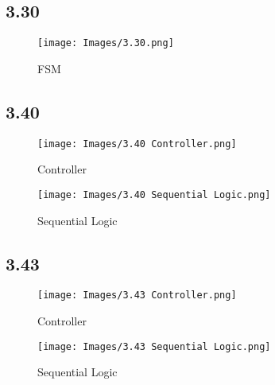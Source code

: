 \clearpage
\subsection*{3.30}
\begin{figure}[!ht]
    \centering
    \texttt{[image: Images/3.30.png]}
    \caption{FSM}
\end{figure}

\subsection*{3.40}
\begin{figure}[!ht]
    \centering
    \texttt{[image: Images/3.40 Controller.png]}
    \caption{Controller}
\end{figure}

\begin{figure}[!ht]
    \centering
    \texttt{[image: Images/3.40 Sequential Logic.png]}
    \caption{Sequential Logic}
\end{figure}

\clearpage
\subsection*{3.43}
\begin{figure}[!ht]
    \centering
    \texttt{[image: Images/3.43 Controller.png]}
    \caption{Controller}
\end{figure}

\begin{figure}[!ht]
    \centering
    \texttt{[image: Images/3.43 Sequential Logic.png]}
    \caption{Sequential Logic}
\end{figure}